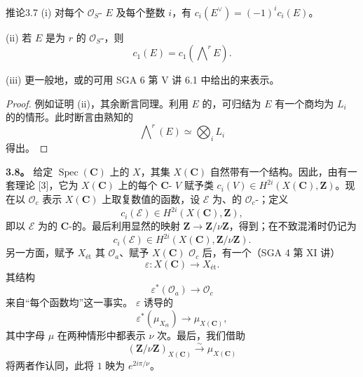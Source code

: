 \begin{SGAresult}{推论}{3.7}
(i) 对每个 $\mathscr O_S$- $E$ 及每个整数 $i$，有 $c_i(E^\vee)=(-1)^ic_i(E)$。

(ii) 若 $E$ 是为 $r$ 的 $\mathscr O_S$-，则
\[
 c_1(E)=c_1(\mathop{\bigwedge}\nolimits^r E).
\]

(iii) 更一般地，或的可用 SGA 6 第 V 讲 6.1 中给出的来表示。
\end{SGAresult}
\begin{proof}
例如证明 (ii)，其余断言同理。利用 $E$ 的，可归结为 $E$ 有一个商均为 $L_i$ 的的情形。此时断言由熟知的
\[
 \mathop{\bigwedge}\nolimits^r(E)\simeq\bigotimes_iL_i
\]
得出。
\end{proof}

\textbf{3.8。} 给定 $\operatorname{Spec}(\mathbf C)$ 上的 $X$，其集 $X(\mathbf C)$ 自然带有一个结构。因此，由有一套理论 [3]，它为 $X(\mathbf C)$ 上的每个 $\mathbf C$- $V$ 赋予类 $c_i(V)\in H^{2i}(X(\mathbf C),\mathbf Z)$。现在以 $\mathscr O_c$ 表示 $X(\mathbf C)$ 上取复数值的函数，设 $\mathscr E$ 为、的 $\mathscr O_c$-；定义
\[
 c_i(\mathscr E)\in H^{2i}(X(\mathbf C),\mathbf Z),
\]
即以 $\mathscr E$ 为的 $\mathbf C$-的。最后利用显然的映射 $\mathbf Z\to\mathbf Z/\nu\mathbf Z$，得到；在不致混淆时仍记为
\[
 c_i(\mathscr E)\in H^{2i}(X(\mathbf C),\mathbf Z/\nu\mathbf Z).\tag{3.8.1}
\]
另一方面，赋予 $X_{\text{ét}}$ 其 $\mathscr O_a$、赋予 $X(\mathbf C)$  $\mathscr O_c$ 后，有一个（SGA 4 第 XI 讲）
\[
 \varepsilon:X(\mathbf C)\longrightarrow X_{\text{ét}}.
\]
其结构
\[
 \varepsilon^*(\mathscr O_a)\longrightarrow\mathscr O_c\tag{3.8.2}
\]
来自“每个函数均”这一事实。 $\varepsilon$ 诱导的
\[
 \varepsilon^*(\mu_{X_{\text{ét}}})\longrightarrow\mu_{X(\mathbf C)},\tag{3.8.3}
\]
其中字母 $\mu$ 在两种情形中都表示 $\nu$ 次。最后，我们借助
\[
 (\mathbf Z/\nu\mathbf Z)_{X(\mathbf C)}\xrightarrow{\sim}\mu_{X(\mathbf C)}\tag{3.8.4}
\]
将两者作认同，此将 $1$ 映为 $e^{2i\pi/\nu}$。

